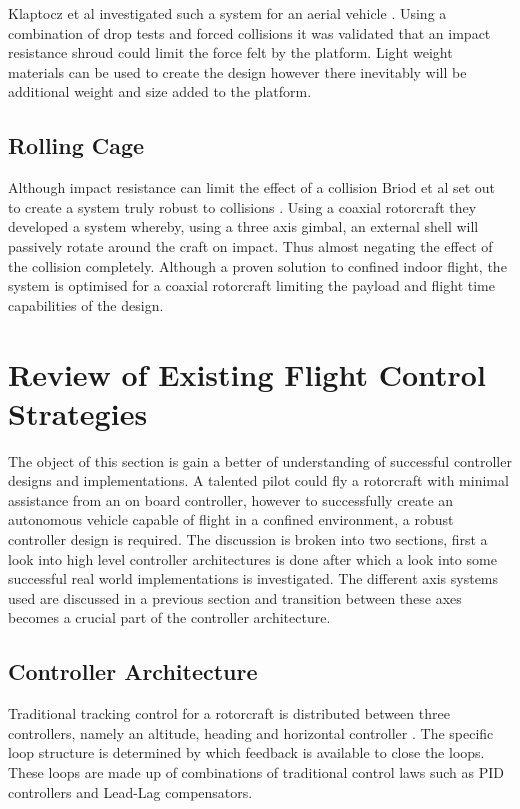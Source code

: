 	Klaptocz et al investigated such a system for an aerial vehicle \cite{Klaptocz2013}. Using a combination of drop tests and forced collisions it was validated that an impact resistance shroud could limit the force felt by the platform. Light weight materials can be used to create the design however there inevitably will be additional weight and size added to the platform.
	
	\subsection{Rolling Cage}
	Although impact resistance can limit the effect of a collision Briod et al set out to create a system truly robust to collisions \cite{Collision, Briod2012, Klaptocz2010}. Using a coaxial rotorcraft they developed a system whereby, using a three axis gimbal, an external shell will passively rotate around the craft on impact. Thus almost negating the effect of the collision completely. Although a proven solution to confined indoor flight, the system is optimised for a coaxial rotorcraft limiting the payload and flight time capabilities of the design.  
	
\section{Review of Existing Flight Control Strategies}\label{SECT_ControlReview}
The object of this section is gain a better of understanding of successful controller designs and implementations. A talented pilot could fly a rotorcraft with minimal assistance from an on board controller, however to successfully create an autonomous vehicle capable of flight in a confined environment, a robust controller design is required. The discussion is broken into two sections, first a look into high level controller architectures is done after which a look into some successful real world implementations is investigated. The different axis systems used are discussed in a previous section and transition between these axes becomes a crucial part of the controller architecture.

	\subsection{Controller Architecture}
	Traditional tracking control for a rotorcraft is distributed between three controllers, namely an altitude, heading and horizontal controller \cite{Moller2015, Mellinger2014}. The specific loop structure is determined by which feedback is available to close the loops. These loops are made up of combinations of traditional control laws such as PID controllers and Lead-Lag compensators.
	
